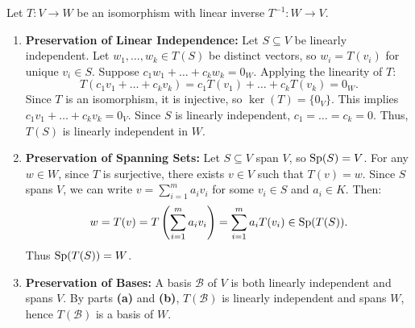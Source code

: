 \begin{exercisesolution}
\label{sol:isomorphisms_preserve_structures}
Let $T \colon V \to W$ be an isomorphism with linear inverse $T^{-1} \colon W \to V$.

\begin{enumerate}[label=\textbf{(\alph*)}]
    \item \textbf{Preservation of Linear Independence:}
    Let $S \subseteq V$ be linearly independent. Let $w_1, \dots, w_k \in T(S)$ be distinct vectors, so $w_i = T(v_i)$ for unique $v_i \in S$.
    Suppose $c_1 w_1 + \dots + c_k w_k = 0_W$.
    Applying the linearity of $T$:
    \[
    T(c_1 v_1 + \dots + c_k v_k) = c_1 T(v_1) + \dots + c_k T(v_k) = 0_W.
    \]
    Since $T$ is an isomorphism, it is injective, so $\ker(T) = \{0_V\}$. This implies $c_1 v_1 + \dots + c_k v_k = 0_V$.
    Since $S$ is linearly independent, $c_1 = \dots = c_k = 0$. Thus, $T(S)$ is linearly independent in $W$.

    \item \textbf{Preservation of Spanning Sets:}
    Let $S \subseteq V$ span $V$, so $\operatorname{Sp}(S) = V$.
    For any $w \in W$, since $T$ is surjective, there exists $v \in V$ such that $T(v) = w$.
    Since $S$ spans $V$, we can write $v = \sum_{i=1}^m a_i v_i$ for some $v_i \in S$ and $a_i \in K$.
    Then:
    \[
    w = T(v) = T\left(\sum_{i=1}^m a_i v_i\right) = \sum_{i=1}^m a_i T(v_i) \in \operatorname{Sp}(T(S)).
    \]
    Thus $\operatorname{Sp}(T(S)) = W$.

    \item \textbf{Preservation of Bases:}
    A basis $\mathcal{B}$ of $V$ is both linearly independent and spans $V$.
    By parts \textbf{(a)} and \textbf{(b)}, $T(\mathcal{B})$ is linearly independent and spans $W$, hence $T(\mathcal{B})$ is a basis of $W$.
\end{enumerate}
\end{exercisesolution}

